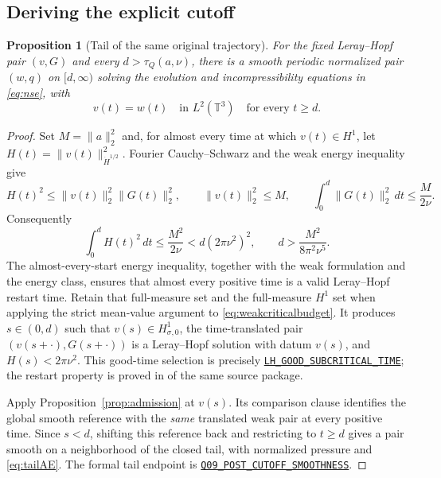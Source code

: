 \documentclass[11pt,a4paper]{article}
\numberwithin{equation}{section}
\theoremstyle{plain}
\newtheorem{proposition}[theorem]{Proposition}
\theoremstyle{definition}
\theoremstyle{remark}
\newcommand{\T}{\mathbb T^3}
\newcommand{\HH}[1]{\dot H^{#1}}
\newcommand{\norm}[2]{\lVert #1\rVert_{#2}}
\newcommand{\tq}{\tau_Q}
\newcommand{\decl}[1]{\begingroup\small\nolinkurl{#1}\endgroup}
\newcommand{\vanchor}[3]{\href{https://github.com/randogelist/Methboke/blob/fdb515d8bde35ec8021bbc26f360aca8dfa2855c/Material/_vendor/QuasiFeffermanB/#1\#L#2}{\decl{#3}}}
\begin{document}
\subsection{Deriving the explicit cutoff}
\begin{proposition}[Tail of the same original trajectory]\label{prop:qfb}
For the fixed Leray--Hopf pair $(v,G)$ and every $d>\tq(a,\nu)$, there
is a smooth periodic normalized pair $(w,q)$ on $[d,\infty)$ solving the
evolution and incompressibility equations in \eqref{eq:nse}, with
\begin{equation}\label{eq:tailAE}
 v(t)=w(t)\quad\text{in }L^2(\T)\quad\text{for every }t\ge d.
\end{equation}
\end{proposition}
\begin{proof}
Set $M=\norm{a}{2}^2$ and, for almost every time at which $v(t)\in H^1$,
let $H(t)=\norm{v(t)}{\HH{1/2}}^2$. Fourier Cauchy--Schwarz and the
weak energy inequality give
\[
 H(t)^2\le\norm{v(t)}{2}^2\norm{G(t)}{2}^2,
 \qquad\norm{v(t)}{2}^2\le M,
 \qquad\int_0^d\norm{G(t)}{2}^2\,dt\le\frac{M}{2\nu}.
\]
Consequently
\begin{equation}\label{eq:weakcriticalbudget}
 \int_0^d H(t)^2\,dt\le\frac{M^2}{2\nu}
 <d(2\pi\nu^2)^2,
 \qquad d>\frac{M^2}{8\pi^2\nu^5}.
\end{equation}
The almost-every-start energy inequality, together with the weak
formulation and the energy class, ensures that almost every positive
time is a valid Leray--Hopf restart time. Retain that full-measure set
and the full-measure $H^1$ set when applying the strict mean-value
argument to \eqref{eq:weakcriticalbudget}. It produces
$s\in(0,d)$ such that $v(s)\in H^1_{\sigma,0}$, the time-translated
pair $(v(s+\cdot),G(s+\cdot))$ is a Leray--Hopf solution with datum
$v(s)$, and $H(s)<2\pi\nu^2$. This good-time selection is precisely
\vanchor{GoodTime.lean}{73}{LH_GOOD_SUBCRITICAL_TIME}; the restart property
is proved in  of the same source package.

Apply Proposition~\ref{prop:admission} at $v(s)$. Its comparison clause
identifies the global smooth reference with the \emph{same} translated
weak pair at every positive time. Since $s<d$, shifting this reference
back and restricting to $t\ge d$ gives a pair smooth on a neighborhood
of the closed tail, with normalized pressure and \eqref{eq:tailAE}.
The formal tail endpoint is
\vanchor{TailChain.lean}{13}{Q09_POST_CUTOFF_SMOOTHNESS}.
\end{proof}
\end{document}
